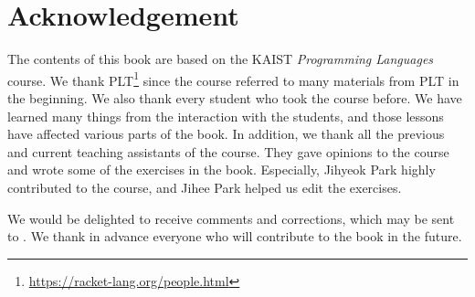 \chapter{Acknowledgement}

The contents of this book are based on the KAIST \textit{Programming Languages}
course. We thank PLT\footnote{\url{https://racket-lang.org/people.html}} since
the course referred to many materials from PLT in the beginning.
We also thank every student who took the
course before. We have learned many things from the interaction with the
students, and those lessons have affected various parts of the book. In
addition, we thank all the previous and current teaching assistants of the
course. They gave opinions to the course and wrote some of the exercises in the
book. Especially, Jihyeok Park highly contributed to the course, and Jihee Park
helped us edit the exercises.

We would be delighted to receive comments and corrections, which may be sent to
. We thank in advance everyone who will contribute
to the book in the future.
